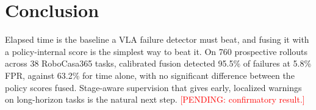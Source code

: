 \documentclass[conference,a4paper]{IEEEtran}
\newcommand{\pending}[1]{\textcolor{red}{[PENDING: #1]}}
\begin{document}
\section{Conclusion}

Elapsed time is the baseline a VLA failure detector must beat, and fusing it with a
policy-internal score is the simplest way to beat it. On 760 prospective rollouts across 38
RoboCasa365 tasks, calibrated fusion detected 95.5\% of failures at 5.8\% FPR, against 63.2\%
for time alone, with no significant difference between the policy scores fused. Stage-aware supervision that gives
early, localized warnings on long-horizon tasks is the natural next step.
\pending{confirmatory result.}



\end{document}
